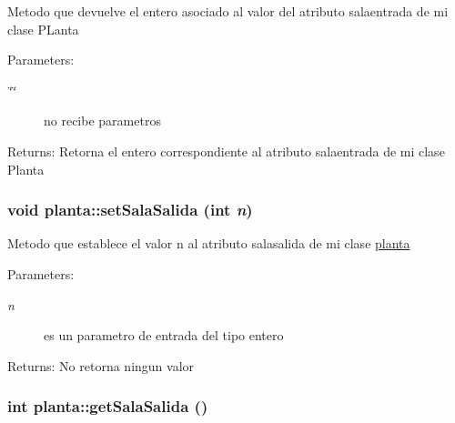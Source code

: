 Metodo que devuelve el entero asociado al valor del atributo salaentrada de mi clase PLanta \begin{Desc}
\item[Parameters:]
\begin{description}
\item[{\em \char`\"{}\char`\"{}}]no recibe parametros \end{description}
\end{Desc}
\begin{Desc}
\item[Returns:]Retorna el entero correspondiente al atributo salaentrada de mi clase Planta \end{Desc}
\hypertarget{classplanta_3a3256c74ea714e55de672068d05ec4d}{
\subsubsection[setSalaSalida]{\setlength{\rightskip}{0pt plus 5cm}void planta::setSalaSalida (int {\em n})}}
\label{classplanta_3a3256c74ea714e55de672068d05ec4d}


Metodo que establece el valor n al atributo salasalida de mi clase \hyperlink{classplanta}{planta} \begin{Desc}
\item[Parameters:]
\begin{description}
\item[{\em n}]es un parametro de entrada del tipo entero \end{description}
\end{Desc}
\begin{Desc}
\item[Returns:]No retorna ningun valor \end{Desc}
\hypertarget{classplanta_dbb3b23569c310dcd01163e09674009c}{
\subsubsection[getSalaSalida]{\setlength{\rightskip}{0pt plus 5cm}int planta::getSalaSalida ()}}
\label{classplanta_dbb3b23569c310dcd01163e09674009c}



